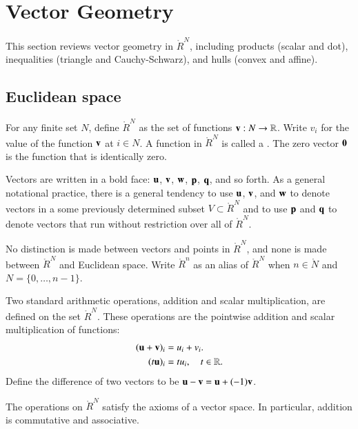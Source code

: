 \section{Vector Geometry}

This section reviews vector geometry in $\ring{R}^N$, including
products (scalar and dot), inequalities (triangle and Cauchy-Schwarz),
and hulls (convex and affine).

\subsection{Euclidean space}

\begin{definition}
  For any finite set $N$, define $\ring{R}^N$ as the set of functions
  ${\mathbf v}:N\to\mathbb{R}$. Write $v_i$ for the value of the function ${\mathbf v}$ at
  $i\in N$.  %
  A function in $\ring{R}^N$ is called a .  The zero
  vector ${\mathbf 0}$ is the function that is identically zero.
\end{definition}
%
Vectors are written in a bold face: ${\mathbf u}$, ${\mathbf v}$, ${\mathbf w}$, ${\mathbf p}$, ${\mathbf q}$, and
so forth.  As a general notational practice, there is a general
tendency to use ${\mathbf u}$, ${\mathbf v}$, and ${\mathbf w}$ to denote vectors in a some
previously determined subset $V\subset \ring{R}^N$ and to use ${\mathbf p}$
and ${\mathbf q}$ to denote vectors that run without restriction over all of
$\ring{R}^N$.

No distinction is made between vectors and points in $\ring{R}^N$, and
none is made between $\ring{R}^N$ and Euclidean space.  Write
$\ring{R}^n$ as an alias of $\ring{R}^N$ when $n\in\ring{N}$ and
$N=\{0,\ldots,n-1\}$.  

\begin{definition} %
  Two standard arithmetic operations, addition and scalar
  multiplication, are defined on the set $\ring{R}^N$.  These
  operations are the pointwise addition and scalar multiplication of
  functions:
\begin{align}
({\mathbf u} + {\mathbf v})_i &= u_i + v_i.\nonumber\\
(t {\mathbf u})_i &= t u_i,\quad t\in\mathbb{R}.
\end{align}
%
%
Define the difference of two vectors to be ${\mathbf u} - {\mathbf v} = {\mathbf u} + (-1) {\mathbf v}$.
%
\end{definition}
The operations on $\ring{R}^N$ 
satisfy the axioms of a vector space. 
In particular, addition is commutative and associative.


